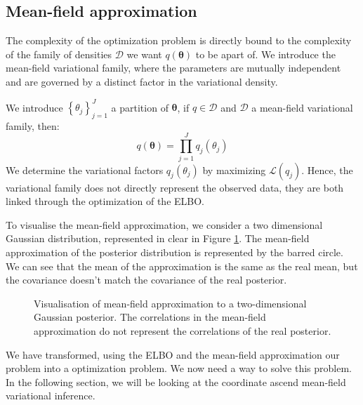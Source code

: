 \documentclass{article}
\numberwithin{equation}{section}
\begin{document}
\subsection{Mean-field approximation}
The complexity of the optimization problem is directly bound to the complexity of the family of densities $\mathcal{D}$ we want $q(\boldsymbol{\theta})$ to be apart of. We introduce the mean-field variational family, where the parameters are mutually independent and are governed by a distinct factor in the variational density.

We introduce $\left\lbrace \theta_j\right\rbrace_{j=1}^J$ a partition of $\boldsymbol{\theta}$, if $q \in \mathcal{D}$ and $\mathcal{D}$ a mean-field variational family, then:
\begin{equation*}
q(\boldsymbol{\theta}) = \prod_{j=1}^J q_j(\theta_j)
\end{equation*}
We determine the variational factors $q_j(\theta_j)$ by maximizing $\mathcal{L}(q_j)$. Hence, the variational family does not directly represent the observed data, they are both linked through the optimization of the \small{ELBO}.

To visualise the mean-field approximation, we consider a two dimensional Gaussian distribution, represented in clear in Figure \ref{fig:mean_field}. The mean-field approximation of the posterior distribution is represented by the barred circle. We can see that the mean of the approximation is the same as the real mean, but the covariance doesn't match the covariance of the real posterior.

\begin{figure}[h!]
\centering
{}
\caption{\label{fig:mean_field}Visualisation of mean-field approximation to a two-dimensional Gaussian posterior. The correlations in the mean-field approximation do not represent the correlations of the real posterior.}
\end{figure}

We have transformed, using the \small{ELBO} and the mean-field approximation our problem into a optimization problem. We now need a way to solve this problem. In the following section, we will be looking at the coordinate ascend mean-field variational inference.
\end{document}
